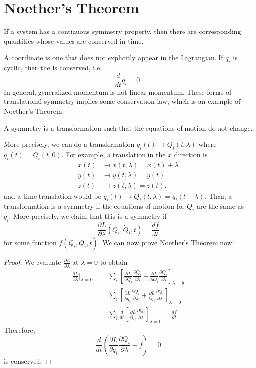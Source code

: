 \documentclass{article}
\numberwithin{equation}{section}
\begin{document}
\section{Noether's Theorem}
\begin{theorem}
    If a system has a continuous symmetry property, then there are corresponding quantities whose values are conserved in time.
\end{theorem}
A  coordinate is one that does not explicitly appear in the Lagrangian. If $q_i$ is cyclic, then the  is conserved, i.e.
\begin{equation*}
    \frac{d}{dt}q_i = 0.
\end{equation*}
In general, generalized momentum is not linear momentum. These forms of translational symmetry implies some conservation law, which is an example of Noether's Theorem.
\begin{definition}
    A symmetry is a transformation such that the equations of motion do not change.
\end{definition}
More precisely, we can do a transformation $q_i(t) \rightarrow Q_i(t,\lambda)$ where $q_i(t) = Q_i(t,0).$ For example, a translation in the $x$ direction is
\begin{align*}
    x(t) &\to x(t,\lambda) = x(t) + \lambda \\ 
    y(t) &\to y(t,\lambda) = y(t) \\ 
    z(t) &\to z(t,\lambda) = z(t).
\end{align*}
and a time translation would be $q_i(t) \to Q_i(t,\lambda)=q_i(t+\lambda)$. Then, a transformation is a symmetry if the equations of motion for $Q_i$ are the same as $q_i.$ More precisely, we claim that this is a symmetry if 
\begin{equation}
    \frac{\partial L}{\partial \lambda}(Q_i,\dot{Q}_i,t) = \frac{df}{dt}
\end{equation}
for some function $f(Q_i,\dot{Q}_i,t).$ We can now prove Noether's Theorem now:
\begin{proof}
    We evaluate $\frac{\partial L}{\partial \lambda}$ at $\lambda=0$ to obtain
    \begin{align*}
        \frac{\partial L}{\partial \lambda}\big|_{\lambda=0} &= \sum_i \left[\frac{\partial L}{\partial Q_i}\frac{\partial Q_i}{\partial \lambda} + \frac{\partial L}{\partial \dot{Q}_i}\frac{\partial \dot{Q}_i}{\partial \lambda}\right]_{\lambda = 0} \\ 
        &= \sum_i \left[\frac{\partial L}{\partial q_i}\frac{\partial Q_i}{\partial \lambda} + \frac{\partial L}{\partial \dot{q}_i}\frac{\partial \dot{Q}_i}{\partial \lambda}\right]_{\lambda = 0} \\ 
        &= \sum_i \frac{d}{dt}\left[\frac{\partial L}{\partial \dot{q}_i}\frac{\partial Q_i}{\partial \lambda}\right]_{\lambda=0} = \frac{df}{dt}.
    \end{align*}
    Therefore,
    \begin{equation}
        \frac{d}{dt}\left(\frac{\partial L}{\partial \dot{q}_i}\frac{\partial Q_i}{\partial \lambda} - f\right) = 0
    \end{equation}
    is conserved.
\end{proof}
\end{document}

